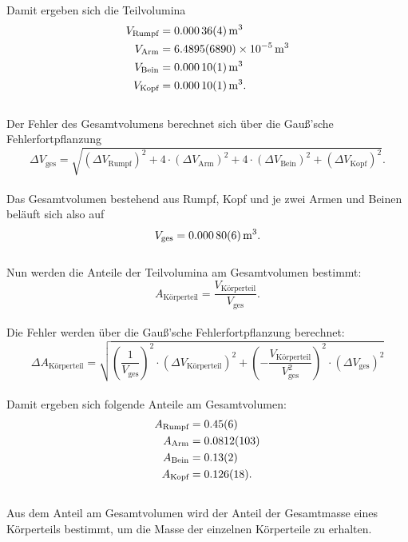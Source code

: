 \\Damit ergeben sich die Teilvolumina
\begin{align*}
V_{\text{Rumpf}} &= \SI{0.00036 \pm 0.00004}{m^3} \\
V_{\text{Arm}} &= \SI{6.4895 \pm 0.6890e-5}{m^3} \\
V_{\text{Bein}} &= \SI{0.0001 \pm 0.00001}{m^3} \\
V_{\text{Kopf}} &= \SI{0.0001 \pm 0.00001}{m^3}.
\end{align*}
\\Der Fehler des Gesamtvolumens berechnet sich über die Gauß'sche Fehlerfortpflanzung
\begin{equation*}
  \Delta V_{\text{ges}}= \sqrt{(\Delta V_{\text{Rumpf}})^2 + 4 \cdot (\Delta V_{\text{Arm}})^2 + 4 \cdot (\Delta V_{\text{Bein}})^2 + (\Delta V_{\text{Kopf}})^2 }.
\label{eqn:gaussgvol}
\end{equation*}
\\Das Gesamtvolumen bestehend aus Rumpf, Kopf und je zwei Armen und Beinen beläuft sich also auf
\begin{equation*}
  V_{\text{ges}}= \SI{0.0008 \pm 0.00006}{m^3}.
\end{equation*}
\\Nun werden die Anteile der Teilvolumina am Gesamtvolumen bestimmt:
\begin{equation}
  A_{\text{Körperteil}} = \frac{V_{\text{Körperteil}}}{V_{\text{ges}}}.
  \label{eqn:anteile}
\end{equation}
\\Die Fehler werden über die Gauß'sche Fehlerfortpflanzung berechnet:
\begin{equation}
  \Delta A_{\text{Körperteil}}=
  \sqrt{ \left(\frac{1}{  V_{\text{ges}}  }\right)^2 \cdot (\Delta V_{  {\text{Körperteil}}})^2
   + \left(- \frac{V_{\text{Körperteil}}}{V_{\text{ges}}^2}\right)^2 \cdot (\Delta V_{\text{ges}})^2 }
  \label{eqn:gaussanteile}
\end{equation}
\\Damit ergeben sich folgende Anteile am Gesamtvolumen:
\begin{align*}
A_{\text{Rumpf}} &= \SI{0.45   \pm 0.06}{} \\
A_{\text{Arm}} &=   \SI{0.0812 \pm 0.0103}{} \\
A_{\text{Bein}} &=  \SI{0.13   \pm 0.02}{} \\
A_{\text{Kopf}} &=  \SI{0.126  \pm 0.018}{}.
\end{align*}
\\Aus dem Anteil am Gesamtvolumen wird der Anteil der Gesamtmasse eines Körperteils bestimmt, um die Masse der einzelnen Körperteile zu erhalten.
